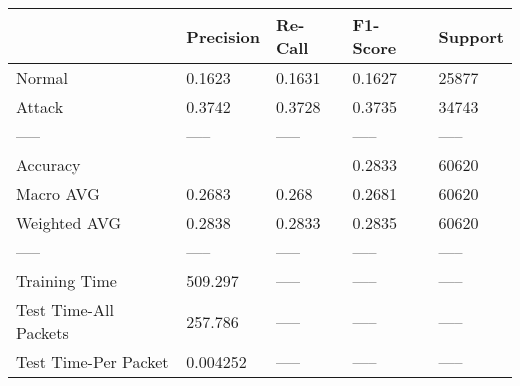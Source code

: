 \begin{tabular}{lllll}
\toprule
{} & Precision & Re-Call & F1-Score & Support \\
\midrule
Normal                &    0.1623 &  0.1631 &   0.1627 &   25877 \\
Attack                &    0.3742 &  0.3728 &   0.3735 &   34743 \\
-----                 &     ----- &   ----- &    ----- &   ----- \\
Accuracy              &           &         &   0.2833 &   60620 \\
Macro AVG             &    0.2683 &   0.268 &   0.2681 &   60620 \\
Weighted AVG          &    0.2838 &  0.2833 &   0.2835 &   60620 \\
-----                 &     ----- &   ----- &    ----- &   ----- \\
Training Time         &   509.297 &   ----- &    ----- &   ----- \\
Test Time-All Packets &   257.786 &   ----- &    ----- &   ----- \\
Test Time-Per Packet  &  0.004252 &   ----- &    ----- &   ----- \\
\bottomrule
\end{tabular}
